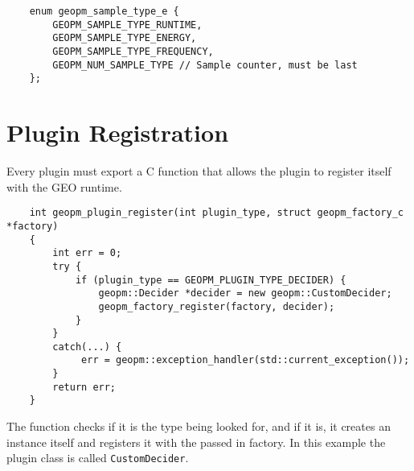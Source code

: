 \documentclass[11pt]{article}
\begin{document}
\begin{verbatim}
    enum geopm_sample_type_e {
        GEOPM_SAMPLE_TYPE_RUNTIME,
        GEOPM_SAMPLE_TYPE_ENERGY,
        GEOPM_SAMPLE_TYPE_FREQUENCY,
        GEOPM_NUM_SAMPLE_TYPE // Sample counter, must be last
    };
\end{verbatim}

\section{Plugin Registration}
Every plugin must export a C function that allows the plugin to
register itself with the GEO runtime.

\begin{verbatim}
    int geopm_plugin_register(int plugin_type, struct geopm_factory_c *factory)
    {
        int err = 0;
        try {
            if (plugin_type == GEOPM_PLUGIN_TYPE_DECIDER) {
                geopm::Decider *decider = new geopm::CustomDecider;
                geopm_factory_register(factory, decider);
            }
        }
        catch(...) {
             err = geopm::exception_handler(std::current_exception());
        }
        return err;
    }
\end{verbatim}
The function checks if it is the type being looked for, and if it is,
it creates an instance itself and registers it with the passed in
factory. In this example the plugin class is called
\verb#CustomDecider#.
\end{document}
